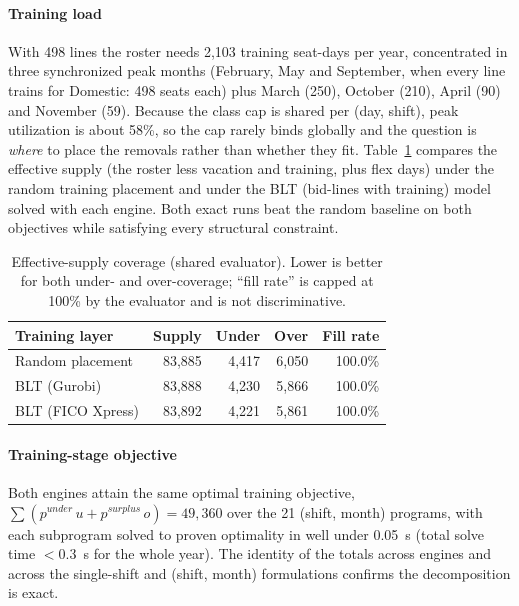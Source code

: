 \documentclass[preprint,12pt]{elsarticle}
\begin{document}
      \paragraph{Training load} With 498 lines the roster needs 2,103 training seat-days per year, concentrated in three synchronized peak months (February, May and September, when every line trains for Domestic: 498 seats each) plus March (250), October (210), April (90) and November (59). Because the class cap is shared per (day, shift), peak utilization is about 58\%, so the cap rarely binds globally and the question is \emph{where} to place the removals rather than whether they fit.
   Table~\ref{tab:coverage} compares the effective supply (the roster less vacation and training, plus flex days) under the random training placement and under the BLT (bid-lines with training) model solved with each engine. Both exact runs beat the random baseline on both objectives while satisfying every structural constraint.

   \begin{table}[t]
      \centering
      \caption{Effective-supply coverage (shared evaluator). Lower is better for both under- and over-coverage; ``fill rate'' is capped at 100\% by the evaluator and is not discriminative.}
      \label{tab:coverage}
      \begin{tabular}{lrrrr}
      \toprule
      Training layer & Supply & Under & Over & Fill rate \\
      \midrule
      Random placement  & 83,885 & 4,417 & 6,050 & 100.0\% \\
      BLT (Gurobi)      & 83,888 & 4,230 & 5,866 & 100.0\% \\
      BLT (FICO Xpress) & 83,892 & 4,221 & 5,861 & 100.0\% \\
      \bottomrule
      \end{tabular}
   \end{table}

   \paragraph{Training-stage objective} Both engines attain the same optimal training objective, $\sum (p^{under}\,u + p^{surplus}\,o) = 49,360$ over the 21 (shift, month) programs, with each subprogram solved to proven optimality in well under 0.05~s (total solve time $< 0.3$~s for the whole year). The identity of the totals across engines and across the single-shift and (shift, month) formulations confirms the decomposition is exact.
\end{document}
